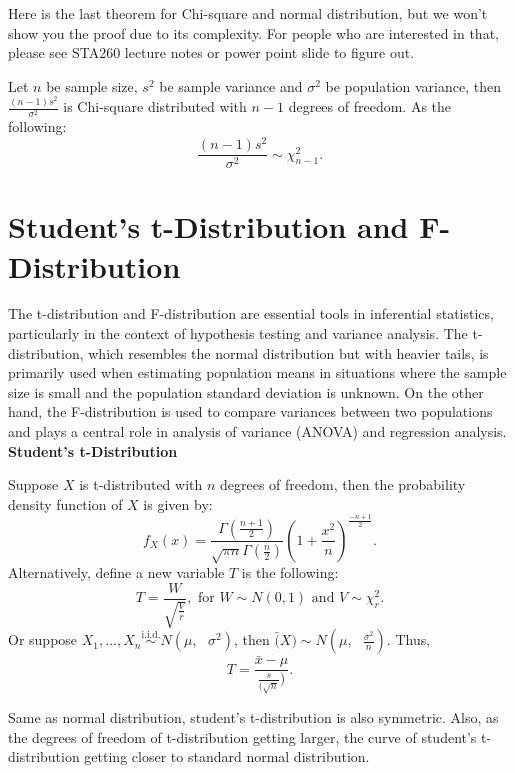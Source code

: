 Here is the last theorem for Chi-square and normal distribution, but we won't show you the proof due to its complexity. For people who are interested in that, please see STA260 lecture notes or power point slide to figure out.

\begin{theorem}
Let $n$ be sample size, $s^2$ be sample variance and $\sigma^2$ be population variance, then $\frac{(n-1)s^2}{\sigma^2}$ is Chi-square distributed with $n - 1$ degrees of freedom. As the following: \[ \frac{(n-1)s^2}{\sigma^2} \sim \chi_{n-1}^{2}.\]
\end{theorem}

\section{Student's t-Distribution and F-Distribution}

The t-distribution and F-distribution are essential tools in inferential statistics, particularly in the context of hypothesis testing and variance analysis. The t-distribution, which resembles the normal distribution but with heavier tails, is primarily used when estimating population means in situations where the sample size is small and the population standard deviation is unknown. On the other hand, the F-distribution is used to compare variances between two populations and plays a central role in analysis of variance (ANOVA) and regression analysis.\\

\textbf{Student's t-Distribution}

\begin{definition}
Suppose $X$ is t-distributed with $n$ degrees of freedom, then the probability density function of $X$ is given by: \[ f_{X}(x) = \frac{\Gamma(\frac{n+1}{2})}{\sqrt{\pi n} \Gamma(\frac{n}{2})} (1+\frac{x^2}{n})^{\frac{-n+1}{2}}.\]
Alternatively, define a new variable $T$ is the following: \[ T = \frac{W}{\sqrt{\frac{V}{r}}}, \text{ for $W \sim N(0, 1)  \text{ and } V \sim \chi_{r}^{2}$.}\]
Or suppose $X_1, ..., X_n \overset{\text{i.i.d.}}{\sim} N(\mu, \text{ } \sigma^2)$, then $\bar(X) \sim N(\mu, \text{ } \frac{\sigma^2}{n})$. Thus, \[ T = \frac{ \bar{x} - \mu}{\frac{s}{(\sqrt{n}})}.\]
\end{definition}

Same as normal distribution, student's t-distribution is also symmetric. Also, as the degrees of freedom of t-distribution getting larger, the curve of student's t-distribution getting closer to standard normal distribution.\\

